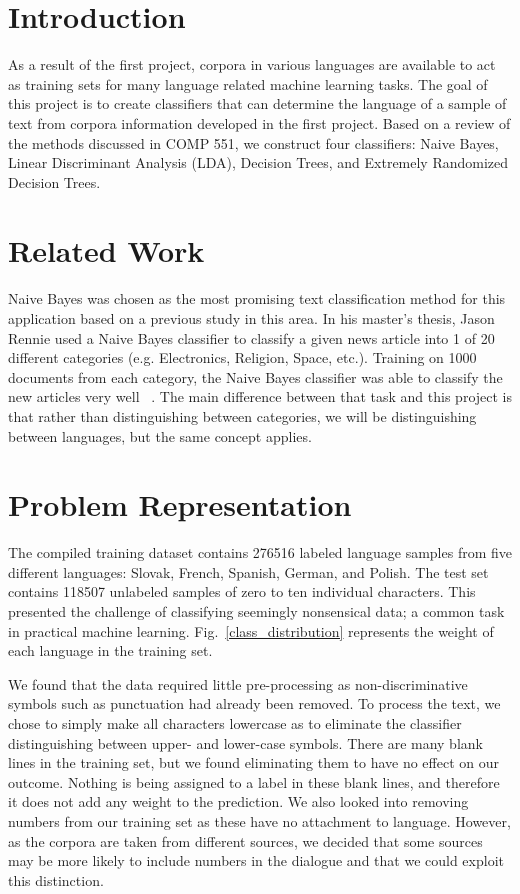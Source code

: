 \documentclass[conference]{IEEEtran}
\begin{document}
\section{Introduction}
As a result of the first project, corpora in various languages are available to act as training sets for many language related machine learning tasks. The goal of this project is to create classifiers that can determine the language of a sample of text from corpora information developed in the first project. Based on a review of the methods discussed in COMP 551, we construct four classifiers: Naive Bayes, Linear Discriminant Analysis (LDA), Decision Trees, and Extremely Randomized Decision Trees.


\section{Related Work}
Naive Bayes was chosen as the most promising text classification method for this application based on a previous study in this area. In his master’s thesis, Jason Rennie used a Naive Bayes classifier to classify a given news article into 1 of 20 different categories (e.g. Electronics, Religion, Space, etc.). Training on 1000 documents from each category, the Naive Bayes classifier was able to classify the new articles very well ~\cite{Rennie}. The main difference between that task and this project is that rather than distinguishing between categories, we will be distinguishing between languages, but the same concept applies. 

\section{Problem Representation}
The compiled training dataset contains 276516 labeled language samples from five different languages: Slovak, French, Spanish, German, and Polish. The test set contains 118507 unlabeled samples of zero to ten individual characters. This presented the challenge of classifying seemingly nonsensical data; a common task in practical machine learning. Fig.~\ref{class_distribution} represents the weight of each language in the training set. 

We found that the data required little pre-processing as non-discriminative symbols such as punctuation had already been removed. To process the text, we chose to simply make all characters lowercase as to eliminate the classifier distinguishing between upper- and lower-case symbols. There are many blank lines in the training set, but we found eliminating them to have no effect on our outcome. Nothing is being assigned to a label in these blank lines, and therefore it does not add any weight to the prediction. We also looked into removing numbers from our training set as these have no attachment to language. However, as the corpora are taken from different sources, we decided that some sources may be more likely to include numbers in the dialogue and that we could exploit this distinction.
\end{document}
